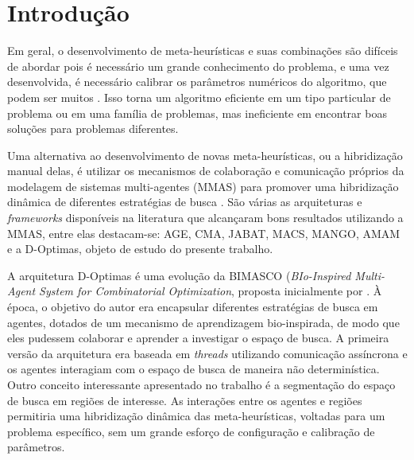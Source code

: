 


\chapter{Introdução}
\label{chap:introducao}

Em geral, o desenvolvimento de meta-heurísticas e suas combinações são difíceis de abordar pois é necessário um grande conhecimento do problema, e uma vez desenvolvida, é necessário calibrar os parâmetros numéricos do algoritmo, que podem ser muitos \cite{stutzle2018}. Isso torna um algoritmo eficiente em um tipo particular de problema ou em uma família de problemas, mas ineficiente em encontrar boas soluções para problemas diferentes.

Uma alternativa ao desenvolvimento de novas meta-heurísticas, ou a hibridização manual delas, é utilizar os mecanismos de colaboração e comunicação próprios da modelagem de sistemas multi-agentes (MMAS) para promover uma hibridização dinâmica de diferentes estratégias de busca \cite{gong2015, zheng2015, fernandes2009, milano2004}. São várias as arquiteturas e \textit{frameworks} disponíveis na literatura que alcançaram bons resultados utilizando a MMAS, entre elas destacam-se: AGE, CMA, JABAT, MACS, MANGO, AMAM \cite{silva2018} e a D-Optimas, objeto de estudo do presente trabalho.

A arquitetura D-Optimas é uma evolução da BIMASCO (\textit{BIo-Inspired Multi-Agent System for Combinatorial Optimization}, proposta inicialmente por . À época, o objetivo do autor era encapsular diferentes estratégias de busca em agentes, dotados de um mecanismo de aprendizagem bio-inspirada, de modo que eles pudessem colaborar e aprender a investigar o espaço de busca. A primeira versão da arquitetura era baseada em \textit{threads} utilizando comunicação assíncrona e os agentes interagiam com o espaço de busca de maneira não determinística. Outro conceito interessante apresentado no trabalho é a segmentação do espaço de busca em regiões de interesse. 
As interações entre os agentes e regiões permitiria uma hibridização dinâmica das meta-heurísticas, voltadas para um problema específico, sem um grande esforço de configuração e calibração de parâmetros.

